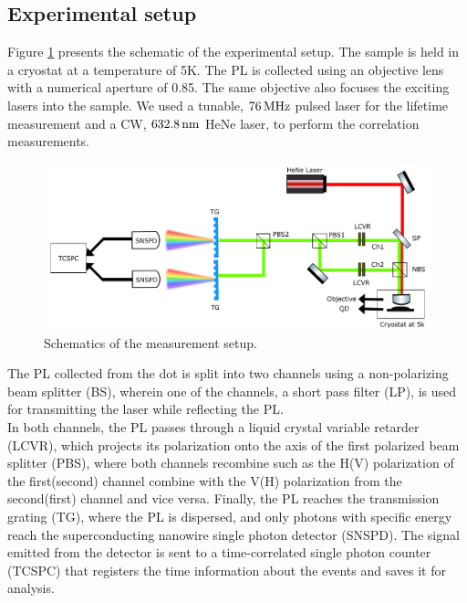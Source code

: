 \subsection{Experimental setup}
Figure \ref{fig:experiment_schematics} presents the schematic of the experimental setup. The sample is held in a cryostat  at a temperature of 5K. The PL is collected using an objective lens with a numerical aperture of 0.85. The same objective also focuses the exciting lasers into the sample. We used a tunable, $76\,\rm MHz$ pulsed laser for the lifetime measurement and a CW, $632.8\,\rm nm$ HeNe laser, to perform the correlation measurements. \\
	\begin{figure}[H]
		\centering
		\includegraphics[scale=0.60]{figures/Experiment_schematics.png}
		\caption{Schematics of the measurement setup.}
		\label{fig:experiment_schematics}
	\end{figure}
The PL collected from the dot is split into two channels using a non-polarizing beam splitter (BS), wherein one of the channels, a short pass filter (LP), is used for transmitting the laser while reflecting the PL.\\
In both channels, the PL passes through a liquid crystal variable retarder (LCVR), which projects its polarization onto the axis of the first polarized beam splitter (PBS), where both channels recombine such as the H(V) polarization of the first(second) channel combine with the V(H) polarization from the second(first) channel and vice versa. Finally, the PL reaches the transmission grating (TG), where the PL is dispersed, and only photons with specific energy reach the superconducting nanowire single photon detector (SNSPD). The signal emitted from the detector is sent to a time-correlated single photon counter (TCSPC) that registers the time information about the events and saves it for analysis. 


